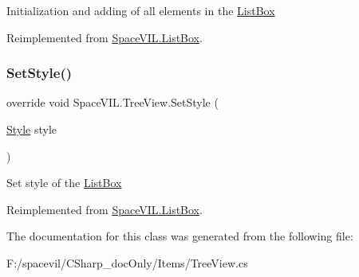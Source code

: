 Initialization and adding of all elements in the \mbox{\hyperlink{class_space_v_i_l_1_1_list_box}{List\+Box}} 



Reimplemented from \mbox{\hyperlink{class_space_v_i_l_1_1_list_box_a6fd8d4f254ff3954eb217cda21ebca45}{Space\+V\+I\+L.\+List\+Box}}.

\mbox{\label{class_space_v_i_l_1_1_tree_view_aac5935163cddb3e34bcef8ee112ae1dd}} 
\subsubsection{\texorpdfstring{Set\+Style()}{SetStyle()}}
{\footnotesize\ttfamily override void Space\+V\+I\+L.\+Tree\+View.\+Set\+Style (\begin{DoxyParamCaption}\item[{\mbox{\hyperlink{class_space_v_i_l_1_1_decorations_1_1_style}{Style}}}]{style }\end{DoxyParamCaption})\hspace{0.3cm}{\ttfamily [virtual]}}



Set style of the \mbox{\hyperlink{class_space_v_i_l_1_1_list_box}{List\+Box}} 



Reimplemented from \mbox{\hyperlink{class_space_v_i_l_1_1_list_box_aee5cd595b70e4ca4dff5022c662373d9}{Space\+V\+I\+L.\+List\+Box}}.



The documentation for this class was generated from the following file\+:\begin{DoxyCompactItemize}
\item 
F\+:/spacevil/\+C\+Sharp\+\_\+doc\+Only/\+Items/Tree\+View.\+cs\end{DoxyCompactItemize}
